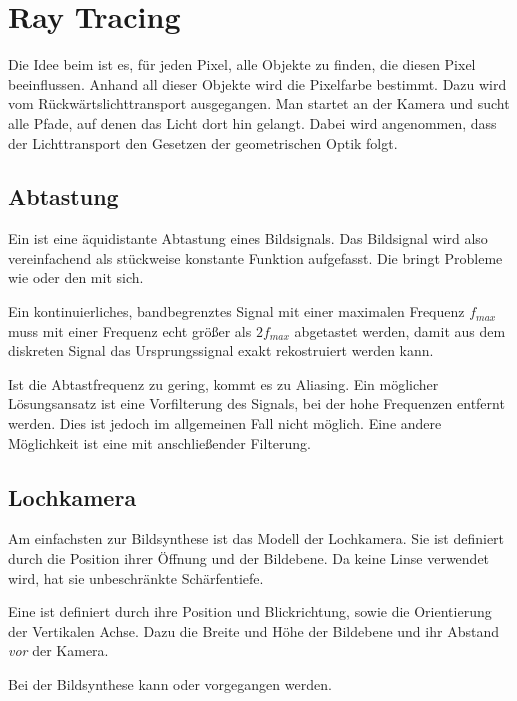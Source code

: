 \chapter{Ray Tracing}
Die Idee beim  ist es, für jeden Pixel, alle Objekte zu finden, die diesen Pixel beeinflussen.
Anhand all dieser Objekte wird die Pixelfarbe bestimmt.
Dazu wird vom Rückwärtslichttransport ausgegangen.
Man startet an der Kamera und sucht alle Pfade, auf denen das Licht dort hin gelangt.
Dabei wird angenommen, dass der Lichttransport den Gesetzen der geometrischen Optik folgt.

\section{Abtastung}
Ein  ist eine äquidistante Abtastung eines Bildsignals.
Das Bildsignal wird also vereinfachend als stückweise konstante Funktion aufgefasst.
Die bringt Probleme wie  oder den  mit sich.

\begin{Theorem}
	Ein kontinuierliches, bandbegrenztes Signal mit einer maximalen Frequenz $f_{max}$ muss mit einer Frequenz echt größer als $2 f_{max}$ abgetastet werden, damit aus dem diskreten Signal das Ursprungssignal exakt rekostruiert werden kann.
\end{Theorem}

Ist die Abtastfrequenz zu gering, kommt es zu Aliasing.
Ein möglicher Lösungsansatz ist eine Vorfilterung des Signals, bei der hohe Frequenzen entfernt werden.
Dies ist jedoch im allgemeinen Fall nicht möglich.
Eine andere Möglichkeit ist eine  mit anschließender Filterung.

\section{Lochkamera}
Am einfachsten zur Bildsynthese ist das Modell der Lochkamera.
Sie ist definiert durch die Position ihrer Öffnung und der Bildebene.
Da keine Linse verwendet wird, hat sie unbeschränkte Schärfentiefe.

Eine  ist definiert durch ihre Position und Blickrichtung, sowie die Orientierung der Vertikalen Achse.
Dazu die Breite und Höhe der Bildebene und ihr Abstand \emph{vor} der Kamera.

Bei der Bildsynthese kann  oder  vorgegangen werden.

